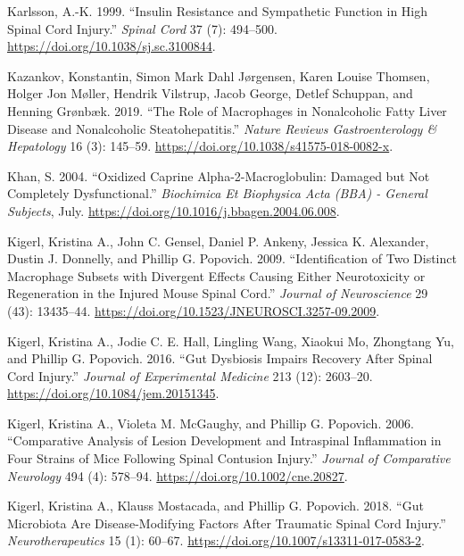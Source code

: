 \documentclass[9pt,lineno]{elife}
\newlength{\cslhangindent}
\newlength{\cslentryspacingunit} %
\newenvironment{CSLReferences}[2] %
 {%
  \setlength{\parindent}{0pt}
  \ifodd #1
  \let\oldpar\par
  \def\par{\hangindent=\cslhangindent\oldpar}
  \fi
  \setlength{\parskip}{#2\cslentryspacingunit}
 }%
 {}
\begin{document}
\begin{CSLReferences}{1}{0}
\leavevmode{}%
Karlsson, A.-K. 1999. {``Insulin Resistance and Sympathetic Function in High Spinal Cord Injury.''} \emph{Spinal Cord} 37 (7): 494--500. \url{https://doi.org/10.1038/sj.sc.3100844}.

\leavevmode{}%
Kazankov, Konstantin, Simon Mark Dahl Jørgensen, Karen Louise Thomsen, Holger Jon Møller, Hendrik Vilstrup, Jacob George, Detlef Schuppan, and Henning Grønbæk. 2019. {``The Role of Macrophages in Nonalcoholic Fatty Liver Disease and Nonalcoholic Steatohepatitis.''} \emph{Nature Reviews Gastroenterology \& Hepatology} 16 (3): 145--59. \url{https://doi.org/10.1038/s41575-018-0082-x}.

\leavevmode{}%
Khan, S. 2004. {``Oxidized Caprine Alpha-2-Macroglobulin: Damaged but Not Completely Dysfunctional.''} \emph{Biochimica Et Biophysica Acta (BBA) - General Subjects}, July. \url{https://doi.org/10.1016/j.bbagen.2004.06.008}.

\leavevmode{}%
Kigerl, Kristina A., John C. Gensel, Daniel P. Ankeny, Jessica K. Alexander, Dustin J. Donnelly, and Phillip G. Popovich. 2009. {``Identification of {Two Distinct Macrophage Subsets} with {Divergent Effects Causing} Either {Neurotoxicity} or {Regeneration} in the {Injured Mouse Spinal Cord}.''} \emph{Journal of Neuroscience} 29 (43): 13435--44. \url{https://doi.org/10.1523/JNEUROSCI.3257-09.2009}.

\leavevmode{}%
Kigerl, Kristina A., Jodie C. E. Hall, Lingling Wang, Xiaokui Mo, Zhongtang Yu, and Phillip G. Popovich. 2016. {``Gut Dysbiosis Impairs Recovery After Spinal Cord Injury.''} \emph{Journal of Experimental Medicine} 213 (12): 2603--20. \url{https://doi.org/10.1084/jem.20151345}.

\leavevmode{}%
Kigerl, Kristina A., Violeta M. McGaughy, and Phillip G. Popovich. 2006. {``Comparative Analysis of Lesion Development and Intraspinal Inflammation in Four Strains of Mice Following Spinal Contusion Injury.''} \emph{Journal of Comparative Neurology} 494 (4): 578--94. \url{https://doi.org/10.1002/cne.20827}.

\leavevmode{}%
Kigerl, Kristina A., Klauss Mostacada, and Phillip G. Popovich. 2018. {``Gut {Microbiota Are Disease-Modifying Factors After Traumatic Spinal Cord Injury}.''} \emph{Neurotherapeutics} 15 (1): 60--67. \url{https://doi.org/10.1007/s13311-017-0583-2}.


\end{CSLReferences}
\end{document}
